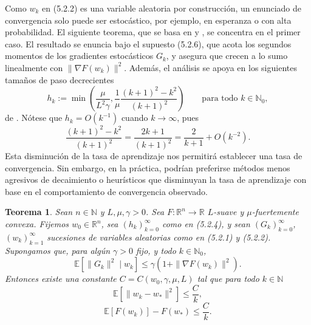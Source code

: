 \documentclass[11pt]{report}
\newenvironment{tcolorbox}[1][]{\par\medskip\noindent\ignorespaces}{\par\medskip}
\theoremstyle{definition}
\theoremstyle{plain}
\newtheorem{teorema}[definicion]{Teorema}
\numberwithin{equation}{section}
\begin{document}
Como \(w_k\) en (5.2.2) es una variable aleatoria por construcción, un enunciado de convergencia solo puede ser estocástico, por ejemplo, en esperanza o con alta probabilidad. El siguiente teorema, que se basa en \cite[Teorema 3.2]{gower-loizou-2019} y \cite[Teorema 4.7]{bottou-curtis-nocedal-2018}, se concentra en el primer caso. El resultado se enuncia bajo el supuesto (5.2.6), que acota los segundos momentos de los gradientes estocásticos \(G_k\), y asegura que crecen a lo sumo linealmente con \(\|\nabla F(w_k)\|^2\). Además, el análisis se apoya en los siguientes tamaños de paso decrecientes
\begin{equation*}
    h_k
    :=
    \min\left(
        \frac{\mu}{L^2\gamma},
        \frac{1}{\mu}
        \frac{(k+1)^2-k^2}{(k+1)^2}
    \right)
    \qquad
    \text{para todo } k\in\mathbb{N}_0,
    \tag{5.2.4}
\end{equation*}
de \cite{gower-loizou-2019}. Nótese que \(h_k=O(k^{-1})\) cuando \(k\to\infty\), pues
\begin{equation*}
    \frac{(k+1)^2-k^2}{(k+1)^2}
    =
    \frac{2k+1}{(k+1)^2}
    =
    \frac{2}{k+1}
    +
    O(k^{-2}).
    \tag{5.2.5}
\end{equation*}
Esta disminución de la tasa de aprendizaje nos permitirá establecer una tasa de convergencia. Sin embargo, en la práctica, podrían preferirse métodos menos agresivos de decaimiento o heurísticos que disminuyan la tasa de aprendizaje con base en el comportamiento de convergencia observado.


\begin{tcolorbox}[colback=blue!8, colframe=blue!8, boxrule=0pt]
\begin{teorema}
Sean \(n\in\mathbb{N}\) y \(L,\mu,\gamma>0\). Sea \(F:\mathbb{R}^n\to\mathbb{R}\) \(L\)-suave y \(\mu\)-fuertemente convexa. Fijemos \(w_0\in\mathbb{R}^n\), sea \((h_k)_{k=0}^{\infty}\) como en (5.2.4), y sean \((G_k)_{k=0}^{\infty}\), \((w_k)_{k=1}^{\infty}\) sucesiones de variables aleatorias como en (5.2.1) y (5.2.2). Supongamos que, para algún \(\gamma>0\) fijo, y todo \(k\in\mathbb{N}_0\),
\begin{equation*}
    \mathbb{E}[\|G_k\|^2\mid w_k]
    \leq
    \gamma(1+\|\nabla F(w_k)\|^2).
    \tag{5.2.6}
\end{equation*}
Entonces existe una constante \(C=C(w_0,\gamma,\mu,L)\) tal que para todo \(k\in\mathbb{N}\)
\begin{equation*}
    \mathbb{E}[\|w_k-w_*\|^2]
    \leq
    \frac{C}{k},
\end{equation*}
\begin{equation*}
    \mathbb{E}[F(w_k)]-F(w_*)
    \leq
    \frac{C}{k}.
\end{equation*}
\end{teorema}
\end{tcolorbox}
\end{document}
